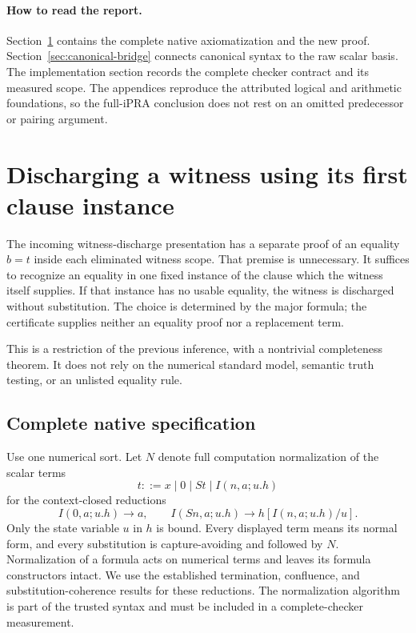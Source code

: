 \documentclass[11pt,a4paper]{article}
\theoremstyle{definition}\newtheorem{definition}[theorem]{Definition}
\theoremstyle{remark}\newtheorem{remark}[theorem]{Remark}
\begin{document}
\paragraph{How to read the report.}
Section~\ref{sec:deterministic-name} contains the complete native
axiomatization and the new proof. Section~\ref{sec:canonical-bridge}
connects canonical syntax to the raw scalar basis. The implementation
section records the complete checker contract and its measured scope.
The appendices reproduce the attributed logical and arithmetic
foundations, so the full-iPRA conclusion does not rest on an omitted
predecessor or pairing argument.



\section{Discharging a witness using its first clause instance}
\label{sec:deterministic-name}

The incoming witness-discharge presentation has a separate proof of an
equality $b=t$ inside each eliminated witness scope. That premise is
unnecessary. It suffices to recognize an equality in one fixed instance of
the clause which the witness itself supplies. If that instance has no usable
equality, the witness is discharged without substitution. The choice is
determined by the major formula; the certificate supplies neither an
equality proof nor a replacement term.

This is a restriction of the previous inference, with a nontrivial
completeness theorem. It does not rely on the numerical standard model,
semantic truth testing, or an unlisted equality rule.

\subsection{Complete native specification}

Use one numerical sort. Let $N$ denote full computation normalization of
the scalar terms
\[
 t ::= x\mid 0\mid St\mid I(n,a;u.h)
\]
for the context-closed reductions
\[
 I(0,a;u.h)\longrightarrow a,
 \qquad I(Sn,a;u.h)\longrightarrow h[I(n,a;u.h)/u].
 \tag{NF}
\]
Only the state variable $u$ in $h$ is bound. Every displayed term means
its normal form, and every substitution is capture-avoiding and followed
by $N$. Normalization of a formula acts on numerical terms and leaves its
formula constructors intact. We use the established termination,
confluence, and substitution-coherence results for these reductions.
The normalization algorithm is part of the trusted syntax and must be
included in a complete-checker measurement.
\end{document}
